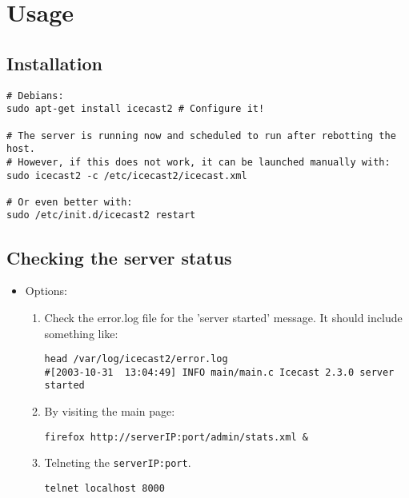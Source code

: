 \chapter{Usage}

\section{Installation}
\begin{verbatim}
# Debians:
sudo apt-get install icecast2 # Configure it!

# The server is running now and scheduled to run after rebotting the host.
# However, if this does not work, it can be launched manually with:
sudo icecast2 -c /etc/icecast2/icecast.xml

# Or even better with:
sudo /etc/init.d/icecast2 restart
\end{verbatim}


\section{Checking the server status}

\begin{itemize}
\item Options:
  \begin{enumerate}
  \item Check the error.log file for the 'server started' message. It
    should include something like:
\begin{verbatim}
head /var/log/icecast2/error.log
#[2003-10-31  13:04:49] INFO main/main.c Icecast 2.3.0 server started
\end{verbatim}
  \item By visiting the main page:
\begin{verbatim}
firefox http://serverIP:port/admin/stats.xml &
\end{verbatim}
  \item Telneting the \texttt{serverIP:port}.
\begin{verbatim}
telnet localhost 8000
\end{verbatim}
  \end{enumerate}
\end{itemize}

